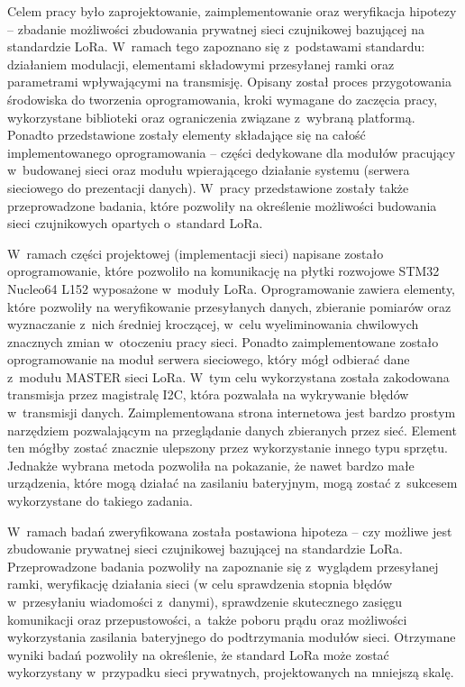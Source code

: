 Celem pracy było zaprojektowanie, zaimplementowanie oraz weryfikacja hipotezy -- zbadanie możliwości zbudowania
prywatnej sieci czujnikowej bazującej na standardzie LoRa. W~ramach tego zapoznano się z~podstawami standardu:
działaniem modulacji, elementami składowymi przesyłanej ramki oraz parametrami wpływającymi na transmisję. Opisany
został proces przygotowania środowiska do tworzenia oprogramowania, kroki wymagane do zaczęcia pracy, wykorzystane
biblioteki oraz ograniczenia związane z~wybraną platformą. Ponadto przedstawione zostały elementy składające się na
całość implementowanego oprogramowania -- części dedykowane dla modułów pracujący w~budowanej sieci oraz modułu
wpierającego działanie systemu (serwera sieciowego do prezentacji danych). W~pracy przedstawione zostały także
przeprowadzone badania, które pozwoliły na określenie możliwości budowania sieci czujnikowych opartych o~standard LoRa.

W~ramach części projektowej (implementacji sieci) napisane zostało oprogramowanie, które pozwoliło na komunikację na
płytki rozwojowe STM32 Nucleo64 L152 wyposażone w~moduły LoRa. Oprogramowanie zawiera elementy, które pozwoliły na
weryfikowanie przesyłanych danych, zbieranie pomiarów oraz wyznaczanie z~nich średniej kroczącej, w~celu wyeliminowania
chwilowych znacznych zmian w~otoczeniu pracy sieci. Ponadto zaimplementowane zostało oprogramowanie na moduł serwera
sieciowego, który mógł odbierać dane z~modułu MASTER sieci LoRa. W~tym celu wykorzystana została zakodowana transmisja
przez magistralę I2C, która pozwalała na wykrywanie błędów w~transmisji danych. Zaimplementowana strona internetowa jest
bardzo prostym narzędziem pozwalającym na przeglądanie danych zbieranych przez sieć. Element ten mógłby zostać znacznie
ulepszony przez wykorzystanie innego typu sprzętu. Jednakże wybrana metoda pozwoliła na pokazanie, że nawet bardzo małe
urządzenia, które mogą działać na zasilaniu bateryjnym, mogą zostać z~sukcesem wykorzystane do takiego zadania.

W~ramach badań zweryfikowana została postawiona hipoteza -- czy możliwe jest zbudowanie prywatnej sieci czujnikowej
bazującej na standardzie LoRa. Przeprowadzone badania pozwoliły na zapoznanie się z~wyglądem przesyłanej ramki,
weryfikację działania sieci (w celu sprawdzenia stopnia błędów w~przesyłaniu wiadomości z~danymi), sprawdzenie
skutecznego zasięgu komunikacji oraz przepustowości, a~także poboru prądu oraz możliwości wykorzystania zasilania
bateryjnego do podtrzymania modułów sieci. Otrzymane wyniki badań pozwoliły na określenie, że standard LoRa może zostać
wykorzystany w~przypadku sieci prywatnych, projektowanych na mniejszą skalę.

